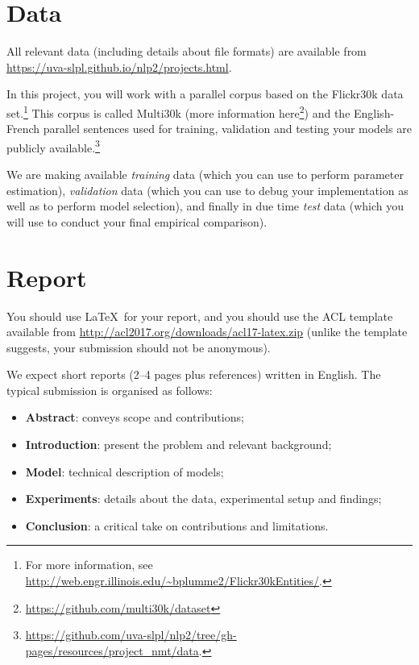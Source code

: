 


\section{Data}

All relevant data (including details about file formats) are available from \url{https://uva-slpl.github.io/nlp2/projects.html}.

In this project, you will work with a parallel corpus based on the Flickr30k data set.\footnote{For more information, see \url{http://web.engr.illinois.edu/~bplumme2/Flickr30kEntities/}.}
This corpus is called Multi30k (more information here\footnote{\url{https://github.com/multi30k/dataset}}) and the English-French parallel sentences used for training, validation and testing your models are publicly available.\footnote{\url{https://github.com/uva-slpl/nlp2/tree/gh-pages/resources/project_nmt/data}.}

We are making available \emph{training} data (which you can use to perform parameter estimation), \emph{validation} data (which you can use to debug your implementation as well as to perform model selection), and finally in due time \emph{test} data (which you will use to conduct your final empirical comparison).



\section{Report}

You should use \LaTeX~for your report, and you should use the ACL template available from \url{http://acl2017.org/downloads/acl17-latex.zip} (unlike the template suggests, your submission should not be anonymous). 

We expect short reports (2--4 pages plus references) written in English. The typical submission is organised as follows: 
\begin{itemize}
	\item \textbf{Abstract}: conveys scope and contributions;
	\item \textbf{Introduction}: present the problem and relevant background;
	\item \textbf{Model}: technical description of models;
	\item \textbf{Experiments}: details about the data, experimental setup and findings;
	\item \textbf{Conclusion}: a critical take on contributions and limitations.
\end{itemize}



